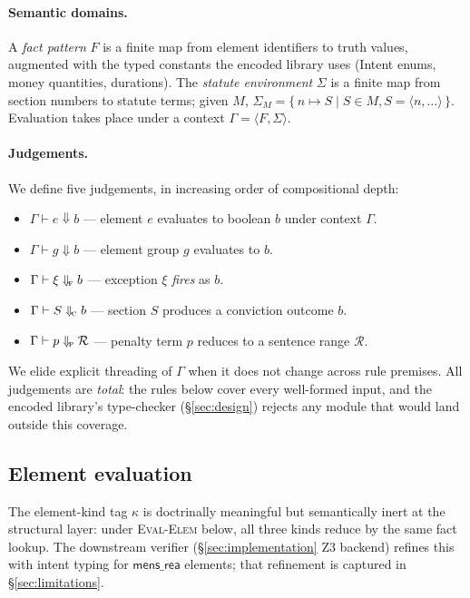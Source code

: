 \paragraph{Semantic domains.} A \emph{fact pattern} $F$ is a
finite map from element identifiers to truth values, augmented
with the typed constants the encoded library uses
(\textsf{Intent} enums, money quantities, durations). The
\emph{statute environment} $\Sigma$ is a finite map from section
numbers to statute terms; given $M$, $\Sigma_M = \{\, n \mapsto S
\mid S \in M, S = \langle n, \ldots \rangle \,\}$. Evaluation
takes place under a context $\Gamma = \langle F, \Sigma \rangle$.

\paragraph{Judgements.} We define five judgements, in increasing
order of compositional depth:

\begin{itemize}
  \item $\Gamma \vdash e \Downarrow b$ — element $e$ evaluates to
    boolean $b$ under context $\Gamma$.
  \item $\Gamma \vdash g \Downarrow b$ — element group $g$
    evaluates to $b$.
  \item $\Gamma \vdash \xi \Downarrow_{\!\textsc{f}} b$ —
    exception $\xi$ \emph{fires} as $b$.
  \item $\Gamma \vdash S \Downarrow_{\!\textsc{c}} b$ — section
    $S$ produces a conviction outcome $b$.
  \item $\Gamma \vdash p \Downarrow_{\!\textsc{p}} \mathcal{R}$ —
    penalty term $p$ reduces to a sentence range $\mathcal{R}$.
\end{itemize}

We elide explicit threading of $\Gamma$ when it does not change
across rule premises. All judgements are \emph{total}: the rules
below cover every well-formed input, and the encoded library's
type-checker (\S\ref{sec:design}) rejects any module that would
land outside this coverage.

\subsection{Element evaluation}
\label{subsec:semantics-elements}

The element-kind tag $\kappa$ is doctrinally meaningful but
semantically inert at the structural layer: under
\textsc{Eval-Elem} below, all three kinds reduce by the same fact
lookup. The downstream verifier
(\S\ref{sec:implementation} Z3 backend) refines this with intent
typing for $\textsf{mens\_rea}$ elements; that refinement is
captured in \S\ref{sec:limitations}.

